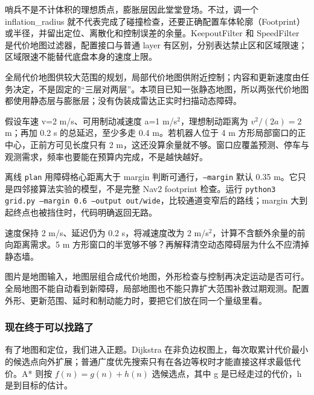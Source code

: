 哨兵不是不计体积的理想质点，膨胀层因此堂堂登场。不过，调一个 inflation\_radius 就不代表完成了碰撞检查，还要正确配置车体轮廓（Footprint）或半径，并留出定位、离散化和控制误差的余量。KeepoutFilter 和 SpeedFilter 是代价地图过滤器，配置接口与普通 layer 有区别，分别表达禁止区和区域限速；区域限速不能替代底盘本身的速度上限。

全局代价地图供较大范围的规划，局部代价地图供附近控制；内容和更新速度由任务决定，不是固定的“三层对两层”。本项目已知一张静态地图，所以两张代价地图都使用静态层与膨胀层；没有伪装成雷达正实时扫描动态障碍。

\begin{example}
假设车速 v=2 m/s、可用制动减速度 a=1 m/s$^2$，理想制动距离为 $v^2/(2a)=2$ m；再加 0.2 s 的总延迟，至少多走 0.4 m。若机器人位于 4 m 方形局部窗口的正中心，正前方可见长度只有 2 m，这还没算余量就不够。窗口应覆盖预测、停车与观测需求，频率也要能在预算内完成，不是越快越好。

离线 \texttt{plan} 用障碍格心距离大于 margin 判断可通行，\texttt{--margin} 默认 0.35 m。它只是四邻接算法实验的模型，不是完整 Nav2 footprint 检查。运行 \texttt{python3 grid.py --margin 0.6 --output out/wide}，比较通道变窄后的路线；margin 大到起终点也被挡住时，代码明确返回无路。
\end{example}
\begin{exercise}\label{ex:nav-costmap}
速度保持 2 m/s、延迟仍为 0.2 s，将减速度改为 2 m/s$^2$，计算不含额外余量的前向距离需求。5 m 方形窗口的半宽够不够？再解释清空动态障碍层为什么不应清掉静态墙。
\end{exercise}
\begin{conclusion}
图片是地图输入，地图层组合成代价地图，外形检查与控制再决定运动是否可行。全局地图不能自动看到新障碍，局部地图也不能只靠扩大范围补救过期观测。配置外形、更新范围、延时和制动能力时，要把它们放在同一个量级里看。
\end{conclusion}

\subsubsection{现在终于可以找路了}
有了地图和定位，我们进入正题。Dijkstra 在非负边权图上，每次取累计代价最小的候选点向外扩展；普通广度优先搜索只有在各边等权时才能直接这样求最低代价。A* 则按 $f(n)=g(n)+h(n)$ 选候选点，其中 g 是已经走过的代价，h 是到目标的估计。

